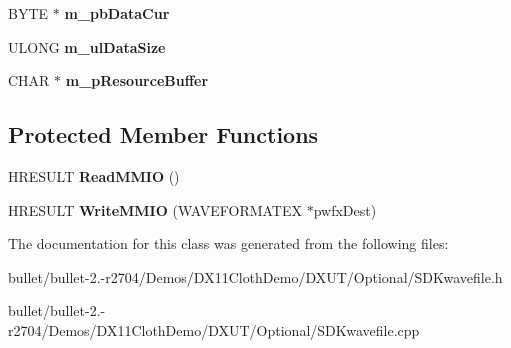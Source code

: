 \begin{DoxyCompactItemize}
\item 
\hypertarget{class_c_wave_file_a2a6915b6dc9f1a6769f7599c838aab92}{B\+Y\+T\+E $\ast$ {\bfseries m\+\_\+pb\+Data\+Cur}}\label{class_c_wave_file_a2a6915b6dc9f1a6769f7599c838aab92}

\item 
\hypertarget{class_c_wave_file_ab6a9adffa66b801758e14431b9fa988d}{U\+L\+O\+N\+G {\bfseries m\+\_\+ul\+Data\+Size}}\label{class_c_wave_file_ab6a9adffa66b801758e14431b9fa988d}

\item 
\hypertarget{class_c_wave_file_afe9cccf84bd794e6f55c3e5e06f558a8}{C\+H\+A\+R $\ast$ {\bfseries m\+\_\+p\+Resource\+Buffer}}\label{class_c_wave_file_afe9cccf84bd794e6f55c3e5e06f558a8}

\end{DoxyCompactItemize}
\subsection*{Protected Member Functions}
\begin{DoxyCompactItemize}
\item 
\hypertarget{class_c_wave_file_af5607e7ba6d1502735dc5bfa0da8d2b9}{H\+R\+E\+S\+U\+L\+T {\bfseries Read\+M\+M\+I\+O} ()}\label{class_c_wave_file_af5607e7ba6d1502735dc5bfa0da8d2b9}

\item 
\hypertarget{class_c_wave_file_aa3524cf0271959bb3f190a58b5669002}{H\+R\+E\+S\+U\+L\+T {\bfseries Write\+M\+M\+I\+O} (W\+A\+V\+E\+F\+O\+R\+M\+A\+T\+E\+X $\ast$pwfx\+Dest)}\label{class_c_wave_file_aa3524cf0271959bb3f190a58b5669002}

\end{DoxyCompactItemize}


The documentation for this class was generated from the following files\+:\begin{DoxyCompactItemize}
\item 
bullet/bullet-\/2.-\/r2704/\+Demos/\+D\+X11\+Cloth\+Demo/\+D\+X\+U\+T/\+Optional/S\+D\+Kwavefile.\+h\item 
bullet/bullet-\/2.-\/r2704/\+Demos/\+D\+X11\+Cloth\+Demo/\+D\+X\+U\+T/\+Optional/S\+D\+Kwavefile.\+cpp\end{DoxyCompactItemize}

